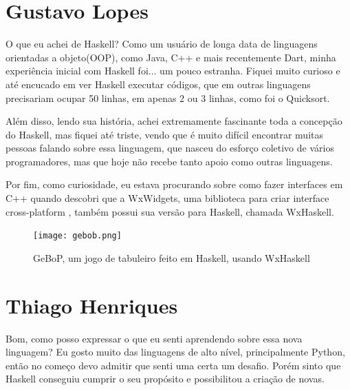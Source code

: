 \documentclass[
  12pt,				         %
  oneside,			       %
  a4paper,			       %
  english,		       	 %
  brazil,			      	 %
]{abntex2}
\begin{document}
    
    \begin{apendicesenv}
      
        \partapendices

        \setcounter{chapter}{0}
        \renewcommand{\thechapter}{\Alph{chapter}}%

        \chapter{Gustavo Lopes}

        O que eu achei de Haskell? Como um usuário de longa data de linguagens orientadas a objeto(OOP), 
        como Java, C++ e mais recentemente Dart, minha experiência inicial com Haskell foi...
        um pouco estranha. Fiquei muito curioso e até encucado em ver Haskell executar códigos, que em
        outras linguagens precisariam ocupar 50 linhas, em apenas 2 ou 3 linhas, como foi o Quicksort.

        Além disso, lendo sua história, achei extremamente fascinante toda a concepção do Haskell,
        mas fiquei até triste, vendo que é muito difícil encontrar muitas pessoas falando sobre essa linguagem, que nasceu 
        do esforço coletivo de vários programadores, mas que hoje não recebe tanto apoio como outras linguagens.

        Por fim, como curiosidade, eu estava procurando sobre como fazer interfaces em C++ quando
        descobri que a WxWidgets, uma biblioteca para criar interface cross-platform , também possui 
        sua versão para Haskell, chamada WxHaskell.

        \begin{figure}[ht]
          \texttt{[image: gebob.png]}
          \caption{GeBoP, um jogo de tabuleiro feito em Haskell, usando WxHaskell}
        \end{figure}

        \newpage

        \chapter{Thiago Henriques}
        
        Bom, como posso expressar o que eu senti aprendendo sobre essa nova linguagem? Eu gosto muito das linguagens de alto nível, principalmente Python,
        então no começo devo admitir que senti uma certa um desafio. Porém sinto que Haskell conseguiu cumprir o 
        seu propósito e possibilitou a criação de novas.


\end{apendicesenv}
\end{document}
